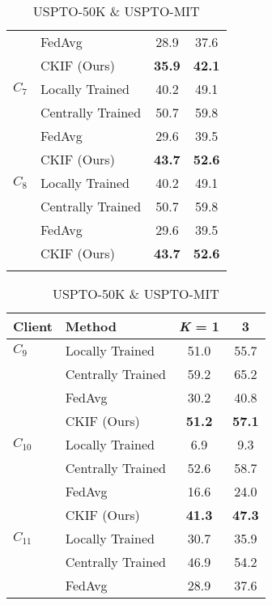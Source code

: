 \begin{table}[t]
\begin{subtable}{0.49\linewidth}
{\begin{tabular}{llcc}
                       & FedAvg   & 28.9 & 37.6 \\
                       & CKIF (Ours)     & \textbf{35.9} & \textbf{42.1} \\
        \midrule
        $C_7$ & Locally Trained   & 40.2 & 49.1 \\
                       & Centrally Trained & 50.7 & 59.8 \\
                       & FedAvg   & 29.6 & 39.5 \\
                       & CKIF (Ours)     & \textbf{43.7} & \textbf{52.6} \\
        \midrule
        $C_8$ & Locally Trained   & 40.2 & 49.1 \\
                        & Centrally Trained & 50.7 & 59.8 \\
                        & FedAvg   & 29.6 & 39.5 \\
                        & CKIF (Ours)     & \textbf{43.7} & \textbf{52.6} \\
        \botrule
    \end{tabular}
    }
    \caption{USPTO-50K \& USPTO-MIT}
    \label{tab:t_rt_2_1}
    \end{subtable}
    \begin{subtable}{0.49\linewidth}{
    \begin{tabular}{llcc}
        \toprule
        Client       & Method                     & \textit{K} = 1 & 3    \\ \midrule
        $C_9$ & Locally Trained   & 51.0 & 55.7 \\
                       & Centrally Trained & 59.2 & 65.2 \\
                       & FedAvg   & 30.2 & 40.8 \\
                       & CKIF (Ours)     & \textbf{51.2} & \textbf{57.1} \\
        \midrule
        $C_{10}$ & Locally Trained   & 6.9 & 9.3 \\
                       & Centrally Trained & 52.6 & 58.7 \\
                       & FedAvg   & 16.6 & 24.0 \\
                       & CKIF (Ours)     & \textbf{41.3} & \textbf{47.3} \\
        \midrule
        $C_{11}$ & Locally Trained   & 30.7 & 35.9 \\
                       & Centrally Trained & 46.9 & 54.2 \\
                       & FedAvg   & 28.9 & 37.6 \\

\end{tabular}}
\end{subtable}
\end{table}
